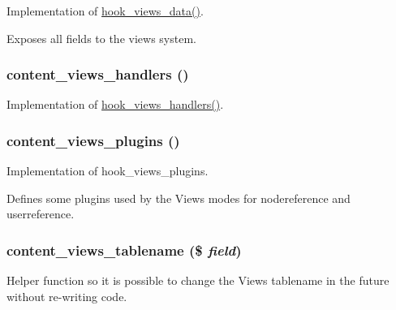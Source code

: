 Implementation of \hyperlink{group__views__hooks_g227057901681e4a33e33c199c7a8c989}{hook\_\-views\_\-data()}.

Exposes all fields to the views system. \hypertarget{content_8views_8inc_02002d63c10df31037660fba19b23a3a}{
\subsubsection[{content\_\-views\_\-handlers}]{\setlength{\rightskip}{0pt plus 5cm}content\_\-views\_\-handlers ()}}
\label{content_8views_8inc_02002d63c10df31037660fba19b23a3a}


Implementation of \hyperlink{group__views__hooks_gbf506f44bd8d8a86876f27396f5341ed}{hook\_\-views\_\-handlers()}. \hypertarget{content_8views_8inc_727b12d4d80b6a884970dcbe22076610}{
\subsubsection[{content\_\-views\_\-plugins}]{\setlength{\rightskip}{0pt plus 5cm}content\_\-views\_\-plugins ()}}
\label{content_8views_8inc_727b12d4d80b6a884970dcbe22076610}


Implementation of hook\_\-views\_\-plugins.

Defines some plugins used by the Views modes for nodereference and userreference. \hypertarget{content_8views_8inc_cf075753edcc51d1d5305e6e78ba1978}{
\subsubsection[{content\_\-views\_\-tablename}]{\setlength{\rightskip}{0pt plus 5cm}content\_\-views\_\-tablename (\$ {\em field})}}
\label{content_8views_8inc_cf075753edcc51d1d5305e6e78ba1978}


Helper function so it is possible to change the Views tablename in the future without re-writing code. 
